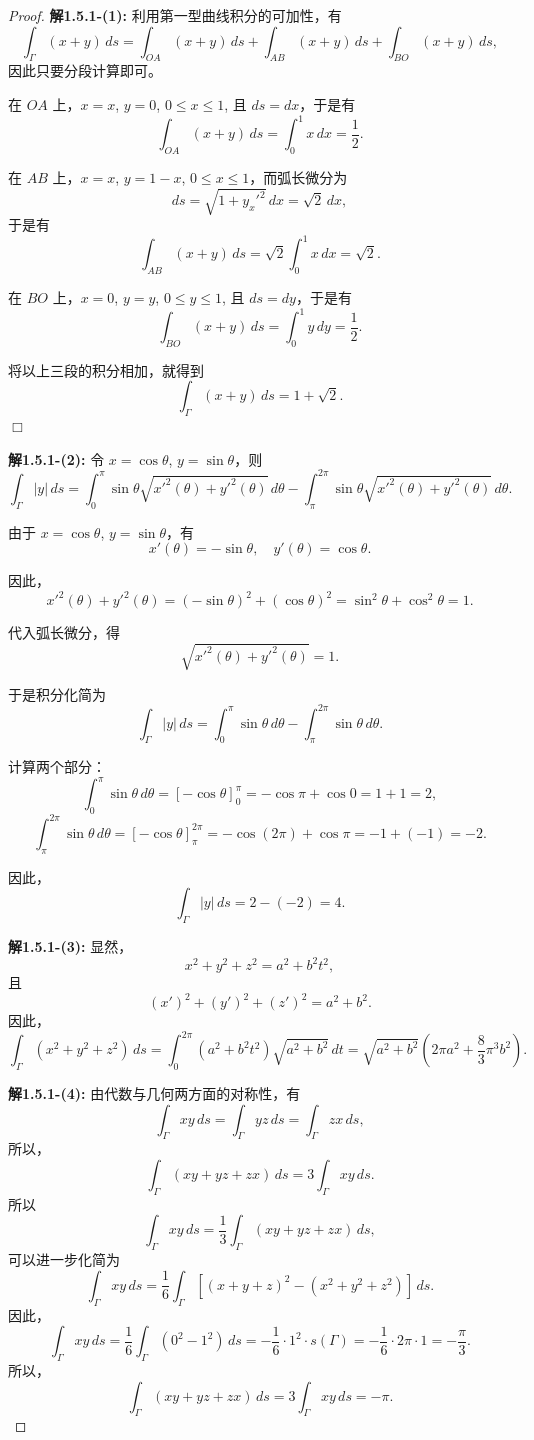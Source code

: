\documentclass[12pt]{ctexart}
\begin{document}
\begin{proof}
\textbf{解1.5.1-(1):} 
利用第一型曲线积分的可加性，有
\[
\int_\Gamma (x + y) \, ds = \int_{OA} (x + y) \, ds + \int_{AB} (x + y) \, ds + \int_{BO} (x + y) \, ds,
\]
因此只要分段计算即可。

在 $OA$ 上，$x = x$, $y = 0$, $0 \leq x \leq 1$, 且 $ds = dx$，于是有
\[
\int_{OA} (x + y) \, ds = \int_0^1 x \, dx = \frac{1}{2}.
\]

在 $AB$ 上，$x = x$, $y = 1 - x$, $0 \leq x \leq 1$，而弧长微分为
\[
ds = \sqrt{1 + y_x'^2} \, dx = \sqrt{2} \, dx,
\]
于是有
\[
\int_{AB} (x + y) \, ds = \sqrt{2} \int_0^1 x \, dx = \sqrt{2}.
\]

在 $BO$ 上，$x = 0$, $y = y$, $0 \leq y \leq 1$, 且 $ds = dy$，于是有
\[
\int_{BO} (x + y) \, ds = \int_0^1 y \, dy = \frac{1}{2}.
\]

将以上三段的积分相加，就得到
\[
\int_\Gamma (x + y) \, ds = 1 + \sqrt{2}.
\]
\hfill $\Box$

\textbf{解1.5.1-(2):} 
令 $x = \cos\theta$, $y = \sin\theta$，则
\[
\int_\Gamma |y| \, ds = \int_0^\pi \sin\theta \sqrt{x'^2(\theta) + y'^2(\theta)} \, d\theta - \int_\pi^{2\pi} \sin\theta \sqrt{x'^2(\theta) + y'^2(\theta)} \, d\theta.
\]

由于 $x = \cos\theta$, $y = \sin\theta$，有
\[
x'(\theta) = -\sin\theta, \quad y'(\theta) = \cos\theta.
\]

因此，
\[
x'^2(\theta) + y'^2(\theta) = (-\sin\theta)^2 + (\cos\theta)^2 = \sin^2\theta + \cos^2\theta = 1.
\]

代入弧长微分，得
\[
\sqrt{x'^2(\theta) + y'^2(\theta)} = 1.
\]

于是积分化简为
\[
\int_\Gamma |y| \, ds = \int_0^\pi \sin\theta \, d\theta - \int_\pi^{2\pi} \sin\theta \, d\theta.
\]

计算两个部分：
\[
\int_0^\pi \sin\theta \, d\theta = \left[-\cos\theta\right]_0^\pi = -\cos\pi + \cos 0 = 1 + 1 = 2,
\]
\[
\int_\pi^{2\pi} \sin\theta \, d\theta = \left[-\cos\theta\right]_\pi^{2\pi} = -\cos(2\pi) + \cos\pi = -1 + (-1) = -2.
\]

因此，
\[
\int_\Gamma |y| \, ds = 2 - (-2) = 4.
\]

\textbf{解1.5.1-(3):} 
显然，
\[
x^2 + y^2 + z^2 = a^2 + b^2t^2,
\]
且
\[
(x')^2 + (y')^2 + (z')^2 = a^2 + b^2.
\]
因此，
\[
\int_\Gamma (x^2 + y^2 + z^2) \, ds = \int_0^{2\pi} \left(a^2 + b^2t^2\right) \sqrt{a^2 + b^2} \, dt = \sqrt{a^2 + b^2} \left(2\pi a^2 + \frac{8}{3}\pi^3b^2\right).
\]

\textbf{解1.5.1-(4):} 
由代数与几何两方面的对称性，有
\[
\int_\Gamma xy \, ds = \int_\Gamma yz \, ds = \int_\Gamma zx \, ds,
\]
所以，
\[
\int_\Gamma (xy + yz + zx) \, ds = 3 \int_\Gamma xy \, ds.
\]
所以
\[
\int_\Gamma xy \, ds = \frac{1}{3} \int_\Gamma (xy + yz + zx) \, ds,
\]
可以进一步化简为
\[
\int_\Gamma xy \, ds = \frac{1}{6} \int_\Gamma \left[(x + y + z)^2 - (x^2 + y^2 + z^2)\right] \, ds.
\]
因此，
\[
\int_\Gamma xy \, ds = \frac{1}{6} \int_\Gamma (0^2 - 1^2) \, ds = -\frac{1}{6} \cdot 1^2 \cdot s(\Gamma) = -\frac{1}{6} \cdot 2\pi \cdot 1 = -\frac{\pi}{3}.
\]
所以，
\[
\int_\Gamma (xy + yz + zx) \, ds = 3 \int_\Gamma xy \, ds=-{\pi}.
\]
\end{proof}
\end{document}
